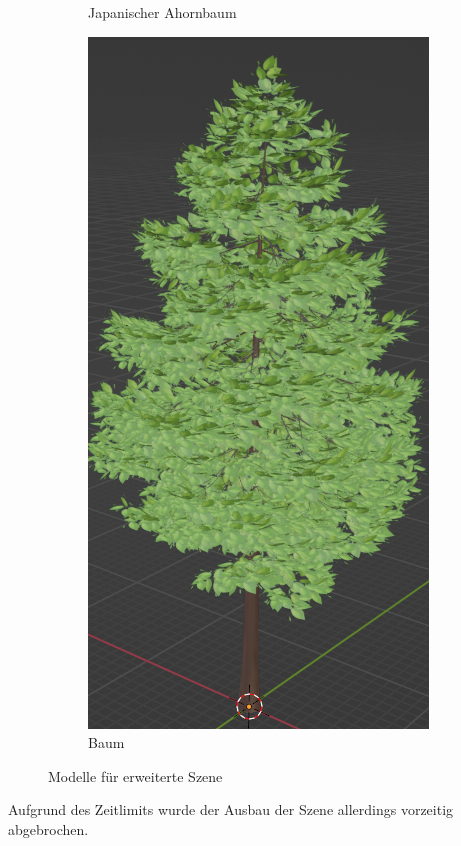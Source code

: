 \begin{figure}[H]
\begin{subfigure}{0.5\textwidth}
		\caption{Japanischer Ahornbaum}
	\end{subfigure}
	\begin{subfigure}{0.5\textwidth}
		\centering
		\includegraphics[height=0.3\pageheight,keepaspectratio]{pics/16}
		\caption{Baum}
	\end{subfigure}
	\caption{Modelle für erweiterte Szene}
\end{figure}
\par
 Aufgrund des Zeitlimits wurde der Ausbau der Szene allerdings vorzeitig abgebrochen.
